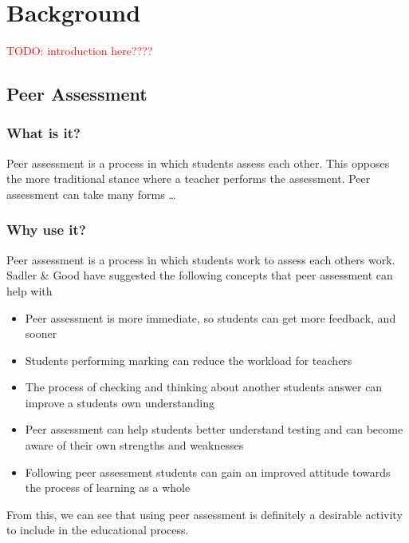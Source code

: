 \documentclass[a4paper,11pt]{report}
\newcommand{\todo}[1]{\textcolor{red}{TODO: #1}}
\begin{document}
\chapter{Background}
\todo{introduction here????}

\section{Peer Assessment}
\subsection{What is it?}
Peer assessment is a process in which students assess each other. This opposes  the more traditional stance where a teacher performs the assessment. Peer assessment can take many forms \dots

\subsection{Why use it?}
Peer assessment is a process in which students work to assess each others work. Sadler \& Good \cite{sadler_impact_2006} have suggested the following concepts that peer assessment can help with
\begin{itemize}
 \item Peer assessment is more immediate, so students can get more feedback, and sooner
 \item Students performing marking can reduce the workload for teachers
 \item The process of checking and thinking about another students answer can improve a students own understanding
 \item Peer assessment can help students better understand testing and can become aware of their own strengths and weaknesses
 \item Following peer assessment students can gain an improved attitude towards the process of learning as a whole
\end{itemize}
From this, we can see that using peer assessment is definitely a desirable activity to include in the educational process.\par
\end{document}
